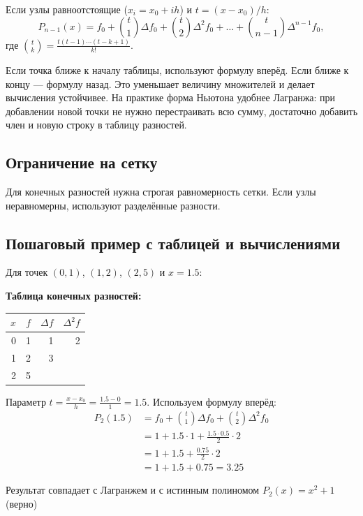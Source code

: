 \documentclass[12pt,a4paper]{article}
\begin{document}
Если узлы равноотстоящие ($x_i=x_0+ih$) и $t=(x-x_0)/h$:
\[
P_{n-1}(x)=f_0+\binom{t}{1}\Delta f_0+\binom{t}{2}\Delta^2 f_0+\dots+\binom{t}{n-1}\Delta^{n-1} f_0,
\]
где $\binom{t}{k}=\frac{t(t-1)\cdots(t-k+1)}{k!}$.

Если точка ближе к началу таблицы, используют формулу вперёд. Если ближе к концу --- формулу назад. Это уменьшает величину множителей и делает вычисления устойчивее. На практике форма Ньютона удобнее Лагранжа: при добавлении новой точки не нужно перестраивать всю сумму, достаточно добавить член и новую строку в таблицу разностей.

\subsection{Ограничение на сетку}

Для конечных разностей нужна строгая равномерность сетки. Если узлы неравномерны, используют разделённые разности.

\subsection{Пошаговый пример с таблицей и вычислениями}

Для точек $(0,1)$, $(1,2)$, $(2,5)$ и $x=1.5$:

\textbf{Таблица конечных разностей:}
\begin{center}
\begin{tabular}{r r r r}
\toprule
$x$ & $f$ & $\Delta f$ & $\Delta^2 f$ \\
\midrule
0 & 1 & 1 & 2 \\
1 & 2 & 3 &  \\
2 & 5 &  &  \\
\bottomrule
\end{tabular}
\end{center}

Параметр $t = \frac{x-x_0}{h} = \frac{1.5-0}{1} = 1.5$. Используем формулу вперёд:
\begin{align*}
P_2(1.5) &= f_0 + \binom{t}{1}\Delta f_0 + \binom{t}{2}\Delta^2 f_0 \\
&= 1 + 1.5 \cdot 1 + \frac{1.5 \cdot 0.5}{2} \cdot 2 \\
&= 1 + 1.5 + \frac{0.75}{2} \cdot 2 \\
&= 1 + 1.5 + 0.75 = 3.25
\end{align*}

Результат совпадает с Лагранжем и с истинным полиномом $P_2(x)=x^2+1$ (верно)
\end{document}
